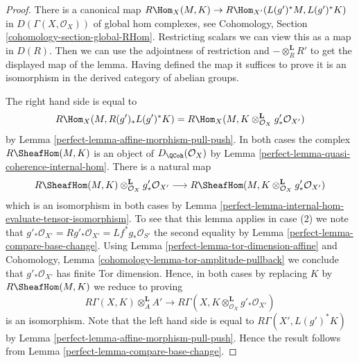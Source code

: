 \begin{proof}

There is a canonical map
$R\Hom_X(M, K) \to R\Hom_{X'}(L(g')^*M, L(g')^*K)$
in $D(\Gamma(X, \mathcal{O}_X))$ of global hom complexes, see
Cohomology, Section \ref{cohomology-section-global-RHom}.
Restricting scalars we can view this as a map in $D(R)$.
Then we can use the adjointness of restriction and
$- \otimes_R^\mathbf{L} R'$ to get the displayed map of the lemma.
Having defined the map it suffices to prove it is an isomorphism
in the derived category of abelian groups.

\medskip\noindent
The right hand side is equal to
$$
R\Hom_X(M, R(g')_*L(g')^*K) =
R\Hom_X(M, K \otimes_{\mathcal{O}_X}^\mathbf{L} g'_*\mathcal{O}_{X'})
$$
by Lemma \ref{perfect-lemma-affine-morphism-pull-push}. In both cases the complex
$R\SheafHom(M, K)$ is an object of $D_\QCoh(\mathcal{O}_X)$ by
Lemma \ref{perfect-lemma-quasi-coherence-internal-hom}. There is a natural map
$$
R\SheafHom(M, K) \otimes_{\mathcal{O}_X}^\mathbf{L} g'_*\mathcal{O}_{X'}
\longrightarrow
R\SheafHom(M, K \otimes_{\mathcal{O}_X}^\mathbf{L} g'_*\mathcal{O}_{X'})
$$
which is an isomorphism in both cases by
Lemma \ref{perfect-lemma-internal-hom-evaluate-tensor-isomorphism}.
To see that this lemma applies in case (2) we note that
$g'_*\mathcal{O}_{X'} = Rg'_*\mathcal{O}_{X'} =
Lf^*g_*\mathcal{O}_{S'}$ the second equality by
Lemma \ref{perfect-lemma-compare-base-change}.
Using Lemma \ref{perfect-lemma-tor-dimension-affine} and
Cohomology, Lemma \ref{cohomology-lemma-tor-amplitude-pullback}
we conclude that $g'_*\mathcal{O}_{X'}$ has finite Tor dimension.
Hence, in both cases by replacing $K$ by $R\SheafHom(M, K)$ we reduce
to proving
$$
R\Gamma(X, K) \otimes^\mathbf{L}_A A' \longrightarrow
R\Gamma(X, K \otimes^\mathbf{L}_{\mathcal{O}_X} g'_*\mathcal{O}_{X'})
$$
is an isomorphism.
Note that the left hand side is equal to $R\Gamma(X', L(g')^*K)$
by Lemma \ref{perfect-lemma-affine-morphism-pull-push}.
Hence the result follows from
Lemma \ref{perfect-lemma-compare-base-change}.
\end{proof}

